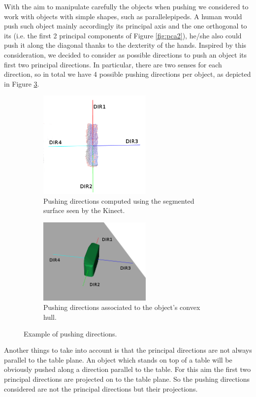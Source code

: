 With the aim to manipulate carefully the objects when pushing we considered to work with objects with simple shapes, such as parallelepipeds. 
A human would push such object mainly accordingly its principal axis and the one orthogonal to its (i.e. the first 2 principal components of Figure \ref{fig:pca2}), he/she also could push it along the diagonal thanks to the dexterity of the hands. 
Inspired by this consideration, we decided to consider as possible directions to push an object its first two principal directions. In particular, there are two senses for each direction, so in total we have 4 possible pushing directions per object, as depicted in Figure \ref{fig:directions}.

\begin{figure}
\centering
\begin{subfigure}[t]{6cm}
\includegraphics[width=5.5cm]{Img/pushing/directions.png}
\caption{Pushing directions computed using the segmented surface seen by the Kinect.}\label{fig:directions1}
\end{subfigure}
\quad
\begin{subfigure}[t]{6cm}
\includegraphics[width=5.5cm]{Img/pushing/directions2.png}
\caption{Pushing directions associated to the object's convex hull.}
\label{fig:directions2}
\end{subfigure}
\caption{Example of pushing directions.}\label{fig:directions}
\end{figure}

Another things to take into account is that the principal directions are not always parallel to the table plane. An object which stands on top of a table will be obviously pushed along a direction parallel to the table. For this aim the first two principal directions are projected on to the table plane. So the pushing directions considered are not the principal directions but their projections. 



